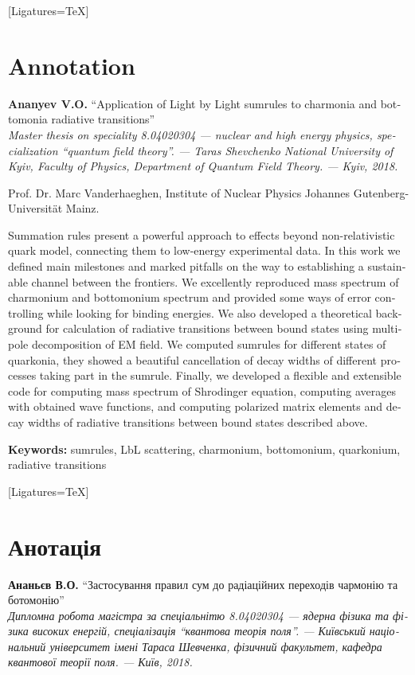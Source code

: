 \begin{titlepage}
    \begin{otherlanguage}{english}
    [Ligatures=TeX]
    \section*{Annotation}
    \textbf{Ananyev V.O.} ``Application of Light by Light sumrules to charmonia and bottomonia radiative transitions'' \\
    {\itshape Master thesis on speciality 8.04020304 --- nuclear and high energy physics, specialization ``quantum field theory''. --- Taras Shevchenko National University of Kyiv, Faculty of Physics, Department of Quantum Field Theory. --- Kyiv, 2018.}

     Prof. Dr. Marc Vanderhaeghen, Institute of Nuclear Physics
Johannes Gutenberg-Universität Mainz.

        Summation rules present a powerful approach to effects beyond non-relativistic quark model, connecting them to low-energy experimental data. In this work we defined main milestones and marked pitfalls on the way to establishing a sustainable channel between the frontiers. We excellently reproduced mass spectrum of charmonium and bottomonium spectrum and provided some ways of error controlling while looking for binding energies. We also developed a theoretical background for calculation of radiative transitions between bound states using multipole decomposition of EM field. We computed sumrules for different states of quarkonia, they showed a beautiful cancellation of decay widths of different processes taking part in the sumrule. Finally, we developed a flexible and extensible code for computing mass spectrum of Shrodinger equation, computing averages with obtained wave functions, and computing polarized matrix elements and decay widths of radiative transitions between bound states described above.

    \textbf{Keywords:} sumrules, LbL scattering, charmonium, bottomonium, quarkonium, radiative transitions
    \end{otherlanguage}
    \vspace{-1cm}
    \begin{otherlanguage}{ukrainian}
    [Ligatures=TeX]
    \section*{Анотація}
    \textbf{Ананьєв В.О.} ``Застосування правил сум до радіаційних переходів чармонію та ботомонію'' \\
    {\itshape Дипломна робота магістра за спеціальнітю 8.04020304 --- ядерна фізика та фізика високих енергій, спеціалізація ``квантова теорія поля''. --- Київський національний університет імені Тараса Шевченка, фізичний факультет, кафедра квантової теорії поля. --- Київ, 2018.}


\end{otherlanguage}
\end{titlepage}
